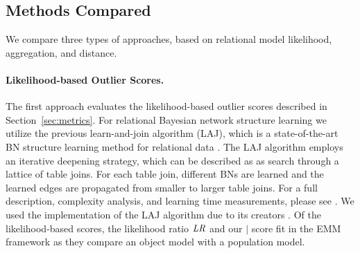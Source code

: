 {\begin{table}
					\end{table}
					
					
					\subsection{Methods Compared}
					\label{sec:methods}
					We compare three types of approaches, based on relational model likelihood, aggregation, and distance. 
					
\paragraph{Likelihood-based Outlier Scores.} The first approach evaluates the likelihood-based outlier scores described in Section~\ref{sec:metrics}. For relational Bayesian network structure learning we utilize the previous learn-and-join algorithm (LAJ), which is
					a state-of-the-art BN structure learning method for relational data \cite{Schulte2012}. The LAJ algorithm employs an iterative deepening strategy, which can be described as as search through a lattice of table joins. For each table join, different BNs are learned and the learned edges are propagated from smaller to larger table joins. 	For a full description, complexity analysis, and learning time measurements, please see \cite{Schulte2012}. 	We used the implementation of the LAJ algorithm due to its creators \cite{bib:jbnsite}. Of the likelihood-based scores, the likelihood ratio $\it{LR}$ and our $\mid$ score fit in the EMM framework as they compare an object model with a population model. 
					
}

